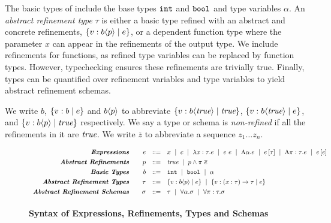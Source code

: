 The basic types of \corelan include the base types $\texttt{int}$ and $\texttt{bool}$
and type variables $\alpha$. An \emph{abstract refinement type} $\tau$ is 
either a basic type refined with an abstract and concrete refinements,
$\left\lbrace v : {b \langle p \rangle}\mid e\right\rbrace$, or 
a dependent function type where the parameter $x$ can appear in the 
refinements of the output type. 
We include refinements for functions, as refined type variables can be 
replaced by function types. However, typechecking ensures these refinements
are trivially true.
%
%
Finally, types can be quantified over refinement variables and type 
variables to yield abstract refinement schemas.

We write 
$b$, 
$\left\lbrace v : b\mid e\right\rbrace$ and 
${b \langle p \rangle}$ 
to abbreviate 
$\left\lbrace v : {b \langle \textit{true} \rangle}\mid \textit{true}\right\rbrace$, 
$\left\lbrace v : {b \langle \textit{true} \rangle}\mid e\right\rbrace$, and
$\left\lbrace v : {b \langle p \rangle}\mid \textit{true}\right\rbrace$ respectively. 
We say a type or schema is \emph{non-refined} if all the 
refinements in it are $\textit{true}$. We write $\overline{z}$ 
to abbreviate a sequence $z_1 \ldots z_n$.


\begin{figure}[t!]
\centering
$$
\begin{array}{rrcl}
\emphbf{Expressions} \quad 
  & e 
  & ::= 
  &      x 
  \spmid c 
  \spmid \efunt{x}{\tau}{e} 
  \spmid \eapp{e}{e} 
  \spmid \etabs{\alpha}{e} 
  \spmid \etapp{e}{\tau} 
  \spmid \epabs{\rvar}{\tau}{e}
  \spmid \epapp{e}{e} 
  \\[0.05in] 

\emphbf{Abstract Refinements} \quad 
  & \areft 
  & ::= 
  &      \true 
  \spmid \areft \land \rvapp{\rvar}{e}
  \\[0.05in] 

\emphbf{Basic Types} \quad 
  & b 
  & ::= 
  &      \tbint
  \spmid \tbbool
  \spmid \alpha
  \\[0.05in]

\emphbf{Abstract Refinement Types} \quad 
  & \tau 
  & ::= 
  &      \tpref{b}{\areft}{\reft} 
  \spmid \trfun{x}{\tau}{\tau}{\reft}
  \\[0.05in]

\emphbf{Abstract Refinement Schemas} \quad 
  & \sigma
  & ::= 
  &      \tau 
  \spmid \ttabs{\alpha}{\sigma}
  \spmid \tpabs{\rvar}{\tau}{\sigma}
  \\[0.05in]
\end{array}
$$
\caption{\textbf{Syntax of Expressions, Refinements, Types and Schemas}}
\label{fig:syntax}
\end{figure}

